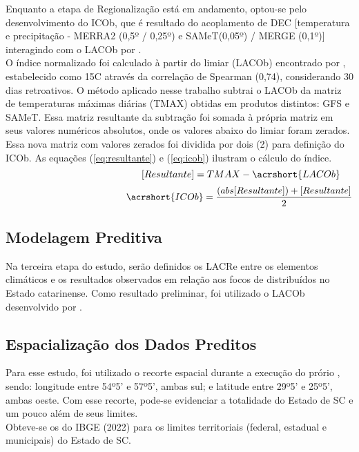 \indent Enquanto a etapa de Regionalização está em andamento, optou-se pelo desenvolvimento do \acrfull{ICOb}, que é resultado do acoplamento de \acrshort{DEC} [temperatura e precipitação - MERRA2 (0,5º / 0,25º) e SAMeT(0,05º) / MERGE (0,1º)]  interagindo com o \acrfull{LACOb} por .\\
\indent O índice normalizado foi calculado à partir do limiar (\acrshort{LACOb}) encontrado por , estabelecido como 15C através da correlação de Spearman (0,74), considerando 30 dias retroativos. O método aplicado nesse trabalho subtrai o \acrshort{LACOb} da matriz de temperaturas máximas diárias (TMAX) obtidas em produtos distintos: \acrshort{GFS} e \acrshort{SAMeT}. Essa matriz resultante da subtração foi somada à própria matriz em seus valores numéricos absolutos, onde os valores abaixo do limiar foram zerados. Essa nova matriz com valores zerados foi dividida por dois (2) para definição do \acrfull{ICOb}. As equações (\ref{eq:resultante}) e (\ref{eq:icob}) ilustram o cálculo do índice.
\begin{equation}
\hspace{4,5cm} [Resultante] = TMAX - \acrshort{LACOb}
    \label{eq:resultante}
\end{equation}
\begin{equation}
\hspace{4.5cm} \acrshort{ICOb} = \frac{(abs[Resultante])+[Resultante]}{2}
    \label{eq:icob}
\end{equation}

\subsection{Modelagem Preditiva}

\indent Na terceira etapa do estudo, serão definidos os  \acrfull{LACRe} entre os elementos climáticos e os resultados observados em relação aos focos de  distribuídos no Estado catarinense. Como resultado preliminar, foi utilizado o \acrshort{LACOb} desenvolvido por .


\subsection{Espacialização dos Dados Preditos}

\indent Para esse estudo, foi utilizado o recorte espacial durante a execução do prório , sendo: longitude entre 54º5' e 57º5', ambas sul; e latitude entre 29º5' e 25º5', ambas oeste. Com esse recorte, pode-se evidenciar a totalidade do Estado de \acrlong{SC} e um pouco além de seus limites.\\
\indent Obteve-se os  do \acrshort{IBGE} (2022) para os limites territoriais (federal, estadual e municipais) do Estado de \acrlong{SC}.\\

